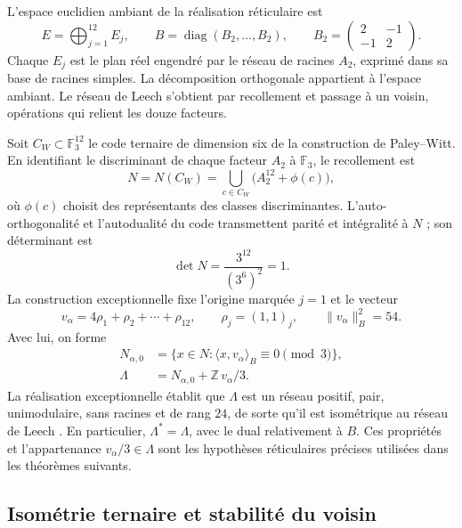 L’espace euclidien ambiant de la réalisation réticulaire est
\begin{equation}
 E=\bigoplus_{j=1}^{12}E_j,\qquad
 B=\operatorname{diag}(B_2,\ldots,B_2),\qquad
 B_2=\begin{pmatrix}2&-1\\-1&2\end{pmatrix}.
 \label{eq:leech-ambient}
\end{equation}
Chaque \(E_j\) est le plan réel engendré par le réseau de racines
\(A_2\), exprimé dans sa base de racines simples. La décomposition
orthogonale appartient à l’espace ambiant. Le réseau de Leech
s’obtient par recollement et passage à un voisin, opérations qui relient
les douze facteurs.

Soit \(C_W\subset\mathbb F_3^{12}\) le code ternaire de dimension six
de la construction de Paley--Witt. En identifiant le discriminant de chaque
facteur \(A_2\) à \(\mathbb F_3\), le recollement est
\[
 N=N(C_W)=
 \bigcup_{c\in C_W}\bigl(A_2^{12}+\phi(c)\bigr),
\]
où \(\phi(c)\) choisit des représentants des classes discriminantes.
L’auto-orthogonalité et l’autodualité du code transmettent parité et
intégralité à \(N\) ; son déterminant est
\[
 \det N=\frac{3^{12}}{(3^6)^2}=1.
\]
La construction exceptionnelle fixe l'origine marquée \(j=1\) et le vecteur
\begin{equation}
 v_\alpha=4\rho_1+\rho_2+\cdots+\rho_{12},
 \qquad \rho_j=(1,1)_j,\qquad
 \|v_\alpha\|_B^2=54.
 \label{eq:leech-marked-vector}
\end{equation}
Avec lui, on forme
\begin{equation}
\begin{split}
 N_{\alpha,0}
  &=\{x\in N:\langle x,v_\alpha\rangle_B\equiv0\pmod3\},\\
 \Lambda&=N_{\alpha,0}+\mathbb Z\,v_\alpha/3.
\end{split}
\label{eq:leech-neighbour}
\end{equation}
La réalisation exceptionnelle établit que \(\Lambda\) est un réseau
positif, pair, unimodulaire, sans racines et de rang \(24\), de sorte qu’il est
isométrique au réseau de Leech \cite{HMT-IV}. En particulier,
\(\Lambda^*=\Lambda\), avec le dual relativement à \(B\).
Ces propriétés et l’appartenance \(v_\alpha/3\in\Lambda\) sont les
hypothèses réticulaires précises utilisées dans les théorèmes suivants.

\subsection{Isométrie ternaire et stabilité du voisin}
\label{subsec:leech-c3}

